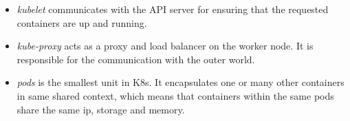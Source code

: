 \begin{itemize}
	\item \textit{kubelet} communicates with the API server for ensuring that the requested containers are up and running.
	\item \textit{kube-proxy} acts as a proxy and load balancer on the worker node. It is responsible for the communication with the outer world.
	\item \textit{pods} is the smallest unit in K8s. It encapsulates one or many other containers in same shared context, which means that containers within the same pods share the same ip, storage and memory.
\end{itemize}